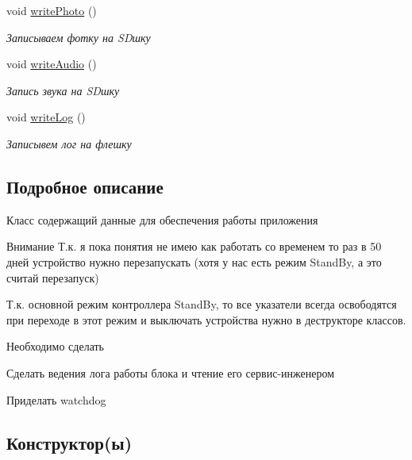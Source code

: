 \begin{DoxyCompactItemize}
void \hyperlink{classapp_1_1_t_application_a2976114a4d6cb5ae83b28459e7a2aa70}{write\+Photo} ()
\begin{DoxyCompactList}\small\item\em Записываем фотку на SD\textquotesingle{}шку \end{DoxyCompactList}\item 
\mbox{\label{classapp_1_1_t_application_ab70622395a7d982ea5f5f53f7cce86c6}} 
void \hyperlink{classapp_1_1_t_application_ab70622395a7d982ea5f5f53f7cce86c6}{write\+Audio} ()
\begin{DoxyCompactList}\small\item\em Запись звука на SD\textquotesingle{}шку \end{DoxyCompactList}\item 
void \hyperlink{classapp_1_1_t_application_a8c4bf0b62709ad4abd9c9027f1f58106}{write\+Log} ()
\begin{DoxyCompactList}\small\item\em Записывем лог на флешку \end{DoxyCompactList}\end{DoxyCompactItemize}


\subsection{Подробное описание}
Класс содержащий данные для обеспечения работы приложения 

\begin{DoxyAttention}{Внимание}
Т.\+к. я пока понятия не имею как работать со временем то раз в 50 дней устройство нужно перезапускать (хотя у нас есть режим Stand\+By, а это считай перезапуск) 

Т.\+к. основной режим контроллера Stand\+By, то все указатели всегда освободятся при переходе в этот режим и выключать устройства нужно в деструкторе классов. 
\end{DoxyAttention}
\begin{DoxyRefDesc}{Необходимо сделать}
\item[\hyperlink{todo__todo000005}{Необходимо сделать}]Сделать ведения лога работы блока и чтение его сервис-\/инженером 

Приделать watchdog \end{DoxyRefDesc}


\subsection{Конструктор(ы)}
\mbox{\label{classapp_1_1_t_application_a5b7af31c95dab9a3f14ee792429a0737}} 
